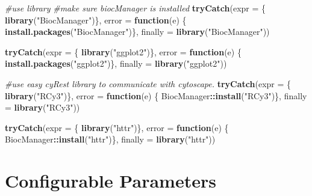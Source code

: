 \documentclass[
]{book}
\newenvironment{Shaded}{\begin{snugshade}}{\end{snugshade}}
\newcommand{\AttributeTok}[1]{\textcolor[rgb]{0.13,0.29,0.53}{#1}}
\newcommand{\CommentTok}[1]{\textcolor[rgb]{0.56,0.35,0.01}{\textit{#1}}}
\newcommand{\ControlFlowTok}[1]{\textcolor[rgb]{0.13,0.29,0.53}{\textbf{#1}}}
\newcommand{\FunctionTok}[1]{\textcolor[rgb]{0.13,0.29,0.53}{\textbf{#1}}}
\newcommand{\NormalTok}[1]{#1}
\newcommand{\SpecialCharTok}[1]{\textcolor[rgb]{0.81,0.36,0.00}{\textbf{#1}}}
\newcommand{\StringTok}[1]{\textcolor[rgb]{0.31,0.60,0.02}{#1}}
\begin{document}
\begin{Shaded}
\begin{Highlighting}[]
\CommentTok{\#use library}
\CommentTok{\#make sure biocManager is installed}
\FunctionTok{tryCatch}\NormalTok{(}\AttributeTok{expr =}\NormalTok{ \{ }\FunctionTok{library}\NormalTok{(}\StringTok{"BiocManager"}\NormalTok{)\}, }
         \AttributeTok{error =} \ControlFlowTok{function}\NormalTok{(e) \{ }
           \FunctionTok{install.packages}\NormalTok{(}\StringTok{"BiocManager"}\NormalTok{)\}, }
         \AttributeTok{finally =} \FunctionTok{library}\NormalTok{(}\StringTok{"BiocManager"}\NormalTok{))}

\FunctionTok{tryCatch}\NormalTok{(}\AttributeTok{expr =}\NormalTok{ \{ }\FunctionTok{library}\NormalTok{(}\StringTok{"ggplot2"}\NormalTok{)\}, }
         \AttributeTok{error =} \ControlFlowTok{function}\NormalTok{(e) \{ }\FunctionTok{install.packages}\NormalTok{(}\StringTok{"ggplot2"}\NormalTok{)\}, }
         \AttributeTok{finally =} \FunctionTok{library}\NormalTok{(}\StringTok{"ggplot2"}\NormalTok{))}

\CommentTok{\#use easy cyRest library to communicate with cytoscape.}
\FunctionTok{tryCatch}\NormalTok{(}\AttributeTok{expr =}\NormalTok{ \{ }\FunctionTok{library}\NormalTok{(}\StringTok{"RCy3"}\NormalTok{)\}, }
         \AttributeTok{error =} \ControlFlowTok{function}\NormalTok{(e) \{ BiocManager}\SpecialCharTok{::}\FunctionTok{install}\NormalTok{(}\StringTok{"RCy3"}\NormalTok{)\}, }
         \AttributeTok{finally =} \FunctionTok{library}\NormalTok{(}\StringTok{"RCy3"}\NormalTok{))}

\FunctionTok{tryCatch}\NormalTok{(}\AttributeTok{expr =}\NormalTok{ \{ }\FunctionTok{library}\NormalTok{(}\StringTok{"httr"}\NormalTok{)\}, }
         \AttributeTok{error =} \ControlFlowTok{function}\NormalTok{(e) \{ BiocManager}\SpecialCharTok{::}\FunctionTok{install}\NormalTok{(}\StringTok{"httr"}\NormalTok{)\}, }
         \AttributeTok{finally =} \FunctionTok{library}\NormalTok{(}\StringTok{"httr"}\NormalTok{))}
\end{Highlighting}
\end{Shaded}

\hypertarget{configurable-parameters-1}{%
\section{Configurable Parameters}\label{configurable-parameters-1}}
\end{document}
